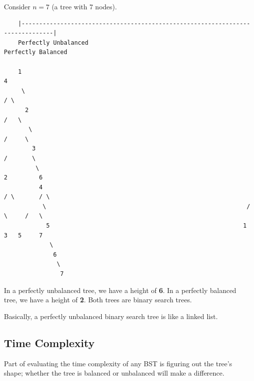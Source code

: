 \documentclass[letterpaper]{article}
\begin{document}
Consider $n = 7$ (a tree with 7 nodes).
\begin{verbatim}
    |-------------------------------------------------------------------------------|
    Perfectly Unbalanced                                           Perfectly Balanced 

    1                                                                       4
     \                                                                     / \  
      2                                                                   /   \ 
       \                                                                 /     \ 
        3                                                               /       \ 
         \                                                             2         6 
          4                                                           / \       / \  
           \                                                         /   \     /   \  
            5                                                       1     3   5     7 
             \                                             
              6                                           
               \                                          
                7
\end{verbatim}
In a perfectly unbalanced tree, we have a height of \textbf{6}. In a perfectly balanced tree, we have a height of \textbf{2}. Both trees are binary search trees. 

\bigskip 

Basically, a perfectly unbalanced binary search tree is like a linked list. 

\subsection{Time Complexity}
Part of evaluating the time complexity of any BST is figuring out the tree's shape; whether the tree is balanced or unbalanced will make a difference. 

\bigskip 
\end{document}
